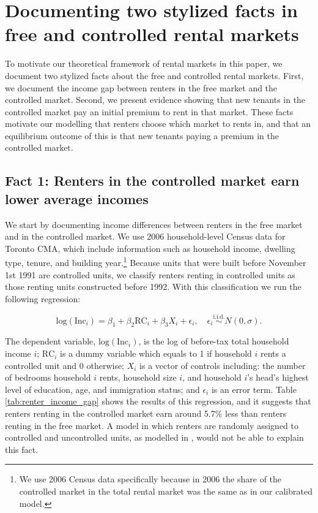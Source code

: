 \documentclass[parskip=full]{article}
\begin{document}
\section{Documenting two stylized facts in free and controlled rental markets}\label{sec:evidence}

To motivate our theoretical framework of rental markets in this paper, we document two stylized facts about the free and controlled rental markets. First, we document the income gap between renters in the free market and the controlled market. Second, we present evidence showing that new tenants in the controlled market pay an initial premium to rent in that market. These facts motivate our modelling that renters choose which market to rents in, and that an equilibrium outcome of this is that new tenants paying a premium in the controlled market.

\subsection{Fact 1: Renters in the controlled market earn lower average incomes}\label{sec:income_gap}

We start by documenting income differences between renters in the free market and in the controlled market. We use 2006 household-level Census data for Toronto CMA, which include information  such as household income, dwelling type, tenure, and building year.\footnote{We use 2006 Census data specifically because in 2006 the share of the controlled market in the total rental market was the same as in our calibrated model.} Because units that were built before November 1st 1991 are controlled units, we classify renters renting in controlled units as those renting units constructed before 1992. With this classification we run the following regression:

\begin{equation}\label{eq:renters_income_gap}
  \mbox{log}(\mbox{Inc}_{i}) = \beta_{1} + \beta_{2}\mbox{RC}_{i}+\beta_{3}X_{i}+\epsilon_{i}, \quad \epsilon_{i}\overset{\mathrm{i.i.d.}}\sim N(0,\sigma).
\end{equation}

\noindent The dependent variable, $\mbox{log}(\mbox{Inc}_{i})$, is the log of before-tax total household income $i$; $\mbox{RC}_{i}$ is a dummy variable which equals to 1 if household $i$ rents a controlled unit and 0 otherwise; $X_{i}$ is a vector of controls including: the number of bedrooms household $i$ rents, household size $i$, and household $i$'s head's highest level of education, age, and immigration status; and $\epsilon_{i}$ is an error term. Table \ref{tab:renter_income_gap} shows the results of this regression, and it suggests that renters renting in the controlled market earn around 5.7\% less than renters renting in the free market. A model in which renters are randomly assigned to controlled and uncontrolled units, as modelled in \citet{fmn-2022}, would not be able to explain this fact. 
\end{document}
